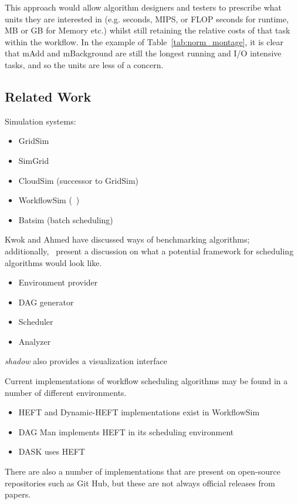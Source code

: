 \documentclass{article}
\begin{document}
\begin{multicols}{2}
This approach would allow algorithm designers and testers to prescribe what units they are interested in (e.g. seconds, MIPS, or FLOP seconds for runtime, MB or GB for Memory etc.) whilst still retaining the relative costs of that task within the workflow. In the example of Table~\ref{tab:norm_montage}, it is clear that mAdd and mBackground are still the longest running and I/O intensive tasks, and so the units are less of a concern.

\subsection*{Related Work}

Simulation systems:
\begin{itemize}
	\item GridSim ~\cite{buyya2002}
	\item SimGrid ~\cite{casanova}
	\item CloudSim (successor to GridSim)~\cite{calheiros2011}
	\item WorkflowSim (~\cite{chen2012a})
	\item Batsim (batch scheduling) ~\cite{dutot2017}
\end{itemize}

Kwok and Ahmed have discussed ways of benchmarking algorithms;
additionally,~\cite{maurya2018} present a discussion on what a potential
framework for scheduling algorithms would look like. 
\begin{itemize}
	\item Environment provider
	\item DAG generator
	\item Scheduler
	\item Analyzer
\end{itemize}
\textit{shadow} also provides a visualization interface

Current implementations of workflow scheduling algorithms may be found in a
number of different environments. 
\begin{itemize}
	\item HEFT and Dynamic-HEFT implementations exist in WorkflowSim
	\item DAG Man implements HEFT in its scheduling environment
	\item DASK uses HEFT
\end{itemize}

There are also a number of implementations that are present on open-source
repositories such as Git Hub, but these are not always official releases from papers. 


\end{multicols}
\end{document}
